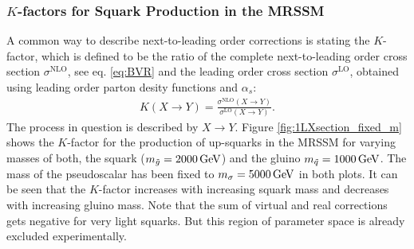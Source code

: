 \subsubsection{$K$-factors for Squark Production in the MRSSM}
A common way to describe next-to-leading order corrections is stating the $K$-factor, which is defined to be the ratio of the complete next-to-leading order cross section $\sigma^{\mathrm{NLO}}$, see eq. \eqref{eq:BVR} and the leading order cross section $\sigma^{\mathrm{LO}}$, obtained using leading order parton desity functions and $\alpha_s$:
\begin{align}
K(X \to Y) = \frac{\sigma^{\mathrm{NLO}}(X \to Y)}{\sigma^{\mathrm{LO}}(X \to Y)}.
\end{align}
The process in question is described by $X \to Y$.
Figure \ref{fig:1LXsection_fixed_m} shows the $K$-factor for the production of up-squarks in the MRSSM for varying masses of both, the squark ($m_{\tilde{g}} = \unit[2000]{GeV}$) and the gluino $m_{\tilde{q}} = \unit[1000]{GeV}$. The mass of the pseudoscalar has been fixed to $m_{\sigma} = \unit[5000]{GeV}$ in both plots. It can be seen that the  $K$-factor increases with increasing squark mass and decreases with increasing gluino mass. Note that the sum of virtual and real corrections gets negative for very light squarks. But this region of parameter space is already excluded experimentally.
